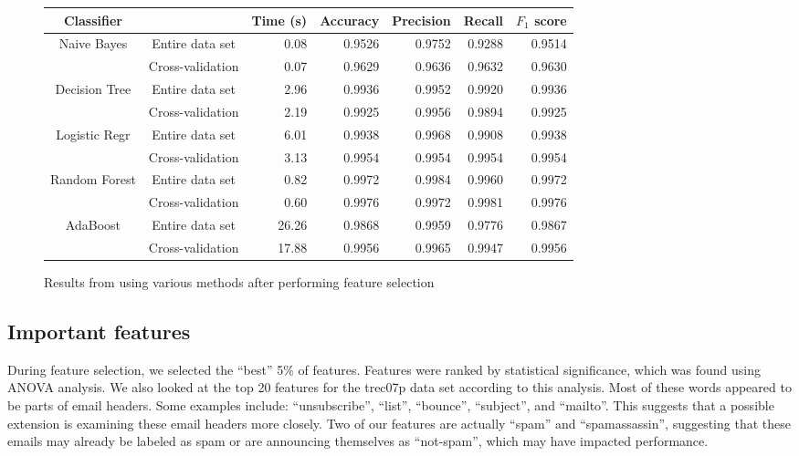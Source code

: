 \documentclass{article} %
\begin{document}
\begin{figure}[h]
  \begin{tabular}[h]{ | c | c | r | r | r | r | r | }
    \hline
    Classifier    &                  & Time (s) & Accuracy & Precision & Recall & $F_1$ score  \\ \hline
    Naive Bayes   & Entire data set  & 0.08     & 0.9526   & 0.9752    & 0.9288 & 0.9514 \\ \cline{2-7}
                  & Cross-validation & 0.07     & 0.9629   & 0.9636    & 0.9632 & 0.9630 \\ \hline
    Decision Tree & Entire data set  & 2.96     & 0.9936   & 0.9952    & 0.9920 & 0.9936 \\ \cline{2-7}
                  & Cross-validation & 2.19     & 0.9925   & 0.9956    & 0.9894 & 0.9925 \\ \hline
    Logistic Regr & Entire data set  & 6.01     & 0.9938   & 0.9968    & 0.9908 & 0.9938 \\ \cline{2-7}
                  & Cross-validation & 3.13     & 0.9954   & 0.9954    & 0.9954 & 0.9954 \\ \hline
    Random Forest & Entire data set  & 0.82     & 0.9972   & 0.9984    & 0.9960 & 0.9972 \\ \cline{2-7}
                  & Cross-validation & 0.60     & 0.9976   & 0.9972    & 0.9981 & 0.9976 \\ \hline
    AdaBoost      & Entire data set  & 26.26    & 0.9868   & 0.9959    & 0.9776 & 0.9867 \\ \cline{2-7}
                  & Cross-validation & 17.88    & 0.9956   & 0.9965    & 0.9947 & 0.9956 \\ \hline
  \end{tabular}
  \caption{Results from using various methods after performing feature selection}
  \label{fig:table_selected}
\end{figure}

\subsection{Important features}
During feature selection, we selected the ``best'' 5\% of features. Features were ranked by statistical significance, which was found using ANOVA analysis. We also looked at the top 20 features for the trec07p data set according to this analysis. Most of these words appeared to be parts of email headers. Some examples include: ``unsubscribe'', ``list'', ``bounce'', ``subject'', and ``mailto''. This suggests that a possible extension is examining these email headers more closely. Two of our features are actually ``spam'' and ``spamassassin'', suggesting that these emails may already be labeled as spam or are announcing themselves as ``not-spam'', which may have impacted performance.
\end{document}
